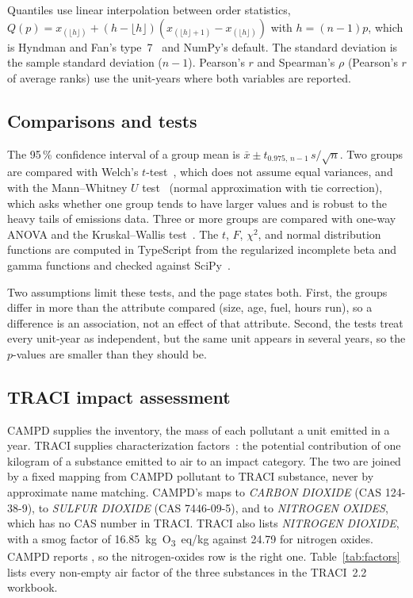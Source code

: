 \documentclass[11pt,a4paper]{article}
\begin{document}
Quantiles use linear interpolation between order statistics, $Q(p) = x_{(\lfloor h\rfloor)} +
(h - \lfloor h\rfloor)(x_{(\lfloor h\rfloor + 1)} - x_{(\lfloor h\rfloor)})$ with $h = (n-1)p$,
which is Hyndman and Fan's type~7~\cite{hyndman1996quantiles} and NumPy's default. The standard
deviation is the sample standard deviation ($n - 1$). Pearson's $r$ and Spearman's $\rho$
(Pearson's $r$ of average ranks) use the unit-years where both variables are reported.

\subsection{Comparisons and tests}

The 95\,\% confidence interval of a group mean is $\bar{x} \pm t_{0.975,\,n-1}\, s/\sqrt{n}$.
Two groups are compared with Welch's $t$-test~\cite{welch1947}, which does not assume equal
variances, and with the Mann--Whitney $U$ test~\cite{mann1947} (normal approximation with tie
correction), which asks whether one group tends to have larger values and is robust to the
heavy tails of emissions data. Three or more groups are compared with one-way ANOVA and the
Kruskal--Wallis test~\cite{kruskal1952}. The $t$, $F$, $\chi^2$, and normal distribution
functions are computed in TypeScript from the regularized incomplete beta and gamma functions
and checked against SciPy~\cite{virtanen2020scipy}.

Two assumptions limit these tests, and the page states both. First, the groups differ in more
than the attribute compared (size, age, fuel, hours run), so a difference is an association, not
an effect of that attribute. Second, the tests treat every unit-year as independent, but the
same unit appears in several years, so the $p$-values are smaller than they should be.

\subsection{TRACI impact assessment}
\label{sec:traci}

CAMPD supplies the inventory, the mass of each pollutant a unit emitted in a year. TRACI supplies
characterization factors~\cite{bare2011traci,epa2022traci22}: the potential contribution of one
kilogram of a substance emitted to air to an impact category. The two are joined by a fixed
mapping from CAMPD pollutant to TRACI substance, never by approximate name matching. CAMPD's
\COtwo{} maps to \emph{CARBON DIOXIDE} (CAS 124-38-9), \SOtwo{} to \emph{SULFUR DIOXIDE} (CAS
7446-09-5), and \NOx{} to \emph{NITROGEN OXIDES}, which has no CAS number in TRACI. TRACI also
lists \emph{NITROGEN DIOXIDE}, with a smog factor of 16.85~kg~O\textsubscript{3}~eq/kg against
24.79 for nitrogen oxides. CAMPD reports \NOx{}, so the nitrogen-oxides row is the right one.
Table~\ref{tab:factors} lists every non-empty air factor of the three substances in the TRACI~2.2
workbook.
\end{document}
